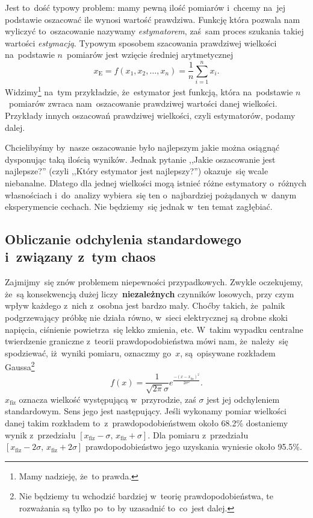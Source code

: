 \documentclass[a4paper,11pt]{article}
\newcommand{\ld}{\ldots}
\newcommand{\tb}{\textbf}
\begin{document}
Jest to~dość typowy problem: mamy pewną ilość pomiarów i~chcemy na~jej
podstawie oszacować ile wynosi wartość prawdziwa. Funkcję która
pozwala nam wyliczyć to~oszacowanie nazywamy \emph{estymatorem},
zaś~sam proces szukania takiej wartości \emph{estymacją}. Typowym
sposobem szacowania prawdziwej wielkości na~podstawie $n$~pomiarów
jest wzięcie średniej arytmetycznej
\begin{equation}
  \label{eq:3}
  x_{ \textrm{E} } = f( x_{ 1 }, x_{ 2 }, \ld, x_{ n } ) = \frac{ 1 }{ n }
  \sum_{ i = 1 }^{ n } x_{ i }.
\end{equation}
Widzimy\footnote{Mamy nadzieję, że~to prawda.} na~tym przykładzie,
że~estymator jest funkcją, która na~podstawie $n$~pomiarów zwraca
nam~oszacowanie prawdziwej wartości danej wielkości. Przykłady innych
oszacowań prawdziwej wielkości, czyli estymatorów, podamy dalej.

Chcielibyśmy by~nasze oszacowanie było najlepszym jakie można osiągnąć
dysponując taką ilością wyników. Jednak pytanie ,,Jakie oszacowanie
jest najlepsze?'' (czyli ,,Który estymator jest najlepszy?'')
okazuje~się wcale niebanalne. Dlatego dla jednej wielkości mogą
istnieć różne estymatory o~różnych własnościach i~do~analizy
wybiera~się ten o~najbardziej pożądanych w~danym eksperymencie
cechach. Nie będziemy~się jednak w~ten temat zagłębiać.





\subsection{Obliczanie odchylenia standardowego i~związany z~tym
  chaos}
\label{sec:obliczanie}

Zajmijmy~się znów problemem niepewności przypadkowych. Zwykle
oczekujemy, że~są konsekwencją dużej liczy~\tb{niezależnych} czynników
losowych, przy czym wpływ każdego z~nich z~osobna jest bardzo mały.
Choćby takich, że~palnik podgrzewający próbkę nie działa równo,
w~sieci elektrycznej są drobne skoki napięcia, ciśnienie powietrza~się
lekko zmienia, etc. W~takim wypadku centralne twierdzenie graniczne
z~teorii prawdopodobieństwa mówi nam, że~należy~się spodziewać,
iż~wyniki pomiaru, oznaczmy go~$x$, są~opisywane rozkładem
Gaussa\footnote{Nie będziemy tu wchodzić bardziej w~teorię
  prawdopodobieństwa, te rozważania są tylko po~to by uzasadnić
  to~co~jest dalej.}
\begin{equation}
  \label{eq:4}
  f( x ) = \frac{ 1 }{ \sqrt{ 2 \pi } \sigma }
  e^{ \frac{ -( x - x_{ \mathrm{fiz} } )^{ 2 } }{ 2 \sigma^{ 2 } } }.
\end{equation}
$x_{ \textrm{fiz} }$ oznacza wielkość występującą w~przyrodzie, zaś
$\sigma$ jest jej odchyleniem standardowym. Sens jego jest
następujący. Jeśli wykonamy pomiar wielkości danej takim rozkładem
to~z~prawdopodobieństwem około 68.2\% dostaniemy wynik z~przedziału
$[ x_{ \textrm{fiz} } - \sigma,\, x_{ \textrm{fiz} } + \sigma ]$. Dla
pomiaru z~przedziału
$[ x_{ \textrm{fiz} } - 2\sigma,\, x_{ \textrm{fiz} } + 2\sigma ]$
prawdopodobieństwo jego uzyskania wyniesie około 95.5\%.
\end{document}
